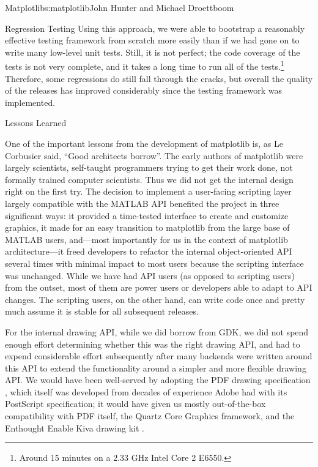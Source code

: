 \begin{aosachapter}{Matplotlib}{s:matplotlib}{John Hunter and Michael Droettboom}
\begin{aosasect1}{Regression Testing}
Using this approach, we were able to bootstrap a reasonably effective
testing framework from scratch more easily than if we had gone on to
write many low-level unit tests.  Still, it is not perfect;  the code
coverage of the tests is not very complete, and it takes a long time to
run all of the tests.\footnote{Around 15 minutes on a 2.33 GHz Intel
  Core 2 E6550.}  Therefore, some regressions do still fall through
the cracks, but overall the quality of the releases has improved
considerably since the testing framework was implemented.

\end{aosasect1}

\begin{aosasect1}{Lessons Learned}

One of the important lessons from the development of matplotlib is,
as Le Corbusier said, ``Good architects borrow''.  The early authors
of matplotlib were largely scientists, self-taught programmers
trying to get their work done, not formally trained computer
scientists. Thus we did not get the internal design right on the
first try. The decision to implement a user-facing scripting layer
largely compatible with the MATLAB API benefited the project in
three significant ways: it provided a time-tested interface to
create and customize graphics, it made for an easy transition to
matplotlib from the large base of MATLAB users, and---most importantly
for us in the context of matplotlib architecture---it freed
developers to refactor the internal object-oriented API several
times with minimal impact to most users because the scripting
interface was unchanged.  While we have had API users (as opposed to
scripting users) from the outset, most of them are power users or
developers able to adapt to API changes.  The scripting users, on
the other hand, can write code once and pretty much assume it is
stable for all subsequent releases.

For the internal drawing API, while we did borrow from GDK, we did not
spend enough effort determining whether this was the right drawing
API, and had to expend considerable effort subsequently after many
backends were written around this API to extend the functionality
around a simpler and more flexible drawing API.  We would have been
well-served by adopting the PDF drawing specification \cite{bib:pdf},
which itself was developed from decades of experience Adobe had with
its PostScript specification; it would have given us mostly
out-of-the-box compatibility with PDF itself, the Quartz Core Graphics
framework, and the Enthought Enable Kiva drawing kit \cite{bib:kiva}.


\end{aosasect1}
\end{aosachapter}
